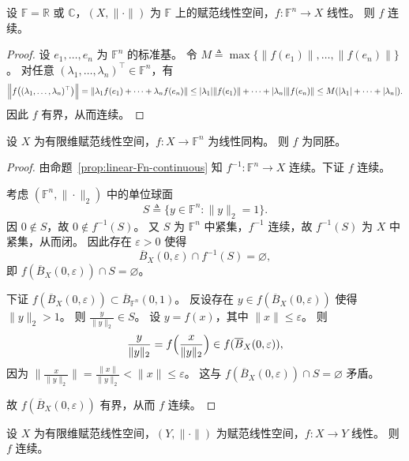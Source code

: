 \documentclass[lang=cn,a4paper,newtx,section]{elegantbook}
\begin{document}
\begin{proposition}\label{prop:linear-Fn-continuous}
  设 $\mathbb{F}=\mathbb{R}$ 或 $\mathbb{C}$，$(X,\|\cdot\|)$ 为 $\mathbb{F}$ 上的赋范线性空间，$f:\mathbb{F}^n\to X$ 线性。
  则 $f$ 连续。
\end{proposition}

\begin{proof}
  设 $e_1,\ldots,e_n$ 为 $\mathbb{F}^n$ 的标准基。
  令 $M\triangleq\max\{\|f(e_1)\|,\ldots,\|f(e_n)\|\}$。
  对任意 $(\lambda_1,\ldots,\lambda_n)^\top\in\mathbb{F}^n$，有
  \[
    \Bigl\|f\bigl((\lambda_1,\ldots,\lambda_n)^\top\bigr)\Bigr\|
    =\|\lambda_1 f(e_1)+\cdots+\lambda_n f(e_n)\|
    \le |\lambda_1|\|f(e_1)\|+\cdots+|\lambda_n|\|f(e_n)\|
    \le M(|\lambda_1|+\cdots+|\lambda_n|).
  \]
  因此 $f$ 有界，从而连续。
\end{proof}

\begin{theorem}
  设 $X$ 为有限维赋范线性空间，$f:X\to\mathbb{F}^n$ 为线性同构。
  则 $f$ 为同胚。
\end{theorem}

\begin{proof}
  由命题~\ref{prop:linear-Fn-continuous} 知 $f^{-1}:\mathbb{F}^n\to X$ 连续。下证 $f$ 连续。

  考虑 $(\mathbb{F}^n,\|\cdot\|_2)$ 中的单位球面
  \[
    S\triangleq\{y\in\mathbb{F}^n:\|y\|_2=1\}.
  \]
  因 $0\notin S$，故 $0\notin f^{-1}(S)$。
  又 $S$ 为 $\mathbb{F}^n$ 中紧集，$f^{-1}$ 连续，故 $f^{-1}(S)$ 为 $X$ 中紧集，从而闭。
  因此存在 $\varepsilon>0$ 使得
  \[
    \overline{B}_X(0,\varepsilon)\cap f^{-1}(S)=\varnothing,
  \]
  即 $f(\overline{B}_X(0,\varepsilon))\cap S=\varnothing$。

  下证 $f(\overline{B}_X(0,\varepsilon))\subset \overline{B}_{\mathbb{F}^n}(0,1)$。
  反设存在 $y\in f(\overline{B}_X(0,\varepsilon))$ 使得 $\|y\|_2>1$。
  则 $\frac{y}{\|y\|_2}\in S$。
  设 $y=f(x)$，其中 $\|x\|\le\varepsilon$。
  则
  \[
    \frac{y}{\|y\|_2}=f\Bigl(\frac{x}{\|y\|_2}\Bigr)\in f(\overline{B}_X(0,\varepsilon)),
  \]
  因为 $\bigl\|\frac{x}{\|y\|_2}\bigr\|=\frac{\|x\|}{\|y\|_2}<\|x\|\le\varepsilon$。
  这与 $f(\overline{B}_X(0,\varepsilon))\cap S=\varnothing$ 矛盾。

  故 $f(\overline{B}_X(0,\varepsilon))$ 有界，从而 $f$ 连续。
\end{proof}

\begin{corollary}
  设 $X$ 为有限维赋范线性空间，$(Y,\|\cdot\|)$ 为赋范线性空间，$f:X\to Y$ 线性。
  则 $f$ 连续。
\end{corollary}
\end{document}
